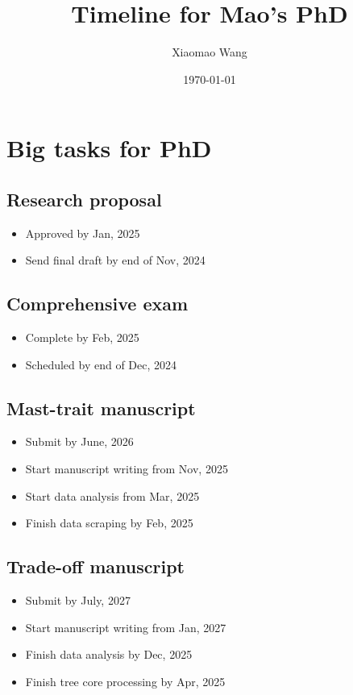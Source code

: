 \documentclass[12pt,letter]{article}
\begin{document}

\renewcommand{\refname}{\CHead{}}

\title{Timeline for Mao's PhD}
\author{Xiaomao Wang} 
\date{\today}
\maketitle

\setlength{\parindent}{0pt}
\setlength{\parskip}{3pt}

\section{Big tasks for PhD}
\subsection{Research proposal}
 \begin{itemize}
	\item Approved by Jan, 2025
	\item Send final draft by end of Nov, 2024
	\end{itemize}
\subsection{Comprehensive exam}
 \begin{itemize}
	\item Complete by Feb, 2025
	\item Scheduled by end of Dec, 2024
	\end{itemize}
\subsection{Mast-trait manuscript}
 \begin{itemize}
	\item Submit by June, 2026
	\item Start manuscript writing from Nov, 2025
	\item Start data analysis from Mar, 2025
	\item Finish data scraping by Feb, 2025
	\end{itemize}
\subsection{Trade-off manuscript}
 \begin{itemize}
	\item Submit by July, 2027
	\item Start manuscript writing from Jan, 2027
	\item Finish data analysis by Dec, 2025
	\item Finish tree core processing by Apr, 2025
	\end{itemize}
\end{document}

